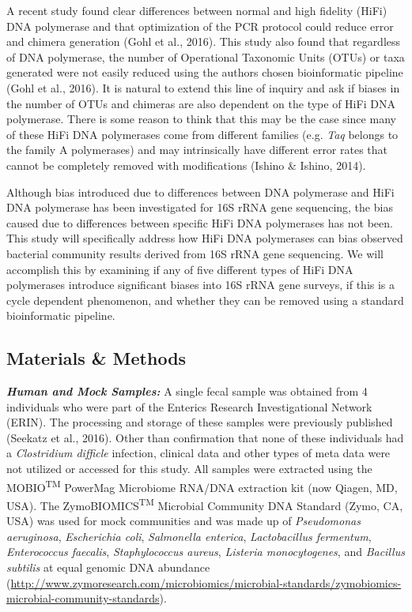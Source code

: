 \documentclass[12pt,]{article}
\begin{document}
A recent study found clear differences between normal and high fidelity
(HiFi) DNA polymerase and that optimization of the PCR protocol could
reduce error and chimera generation (Gohl et al., 2016). This study also
found that regardless of DNA polymerase, the number of Operational
Taxonomic Units (OTUs) or taxa generated were not easily reduced using
the authors chosen bioinformatic pipeline (Gohl et al., 2016). It is
natural to extend this line of inquiry and ask if biases in the number
of OTUs and chimeras are also dependent on the type of HiFi DNA
polymerase. There is some reason to think that this may be the case
since many of these HiFi DNA polymerases come from different families
(e.g. \emph{Taq} belongs to the family A polymerases) and may
intrinsically have different error rates that cannot be completely
removed with modifications (Ishino \& Ishino, 2014).

Although bias introduced due to differences between DNA polymerase and
HiFi DNA polymerase has been investigated for 16S rRNA gene sequencing,
the bias caused due to differences between specific HiFi DNA polymerases
has not been. This study will specifically address how HiFi DNA
polymerases can bias observed bacterial community results derived from
16S rRNA gene sequencing. We will accomplish this by examining if any of
five different types of HiFi DNA polymerases introduce significant
biases into 16S rRNA gene surveys, if this is a cycle dependent
phenomenon, and whether they can be removed using a standard
bioinformatic pipeline.

\newpage

\subsection{Materials \& Methods}\label{materials-methods}

\textbf{\emph{Human and Mock Samples:}} A single fecal sample was
obtained from 4 individuals who were part of the Enterics Research
Investigational Network (ERIN). The processing and storage of these
samples were previously published (Seekatz et al., 2016). Other than
confirmation that none of these individuals had a \emph{Clostridium
difficle} infection, clinical data and other types of meta data were not
utilized or accessed for this study. All samples were extracted using
the MOBIO\textsuperscript{TM} PowerMag Microbiome RNA/DNA extraction kit
(now Qiagen, MD, USA). The ZymoBIOMICS\textsuperscript{TM} Microbial
Community DNA Standard (Zymo, CA, USA) was used for mock communities and
was made up of \emph{Pseudomonas aeruginosa}, \emph{Escherichia coli},
\emph{Salmonella enterica}, \emph{Lactobacillus fermentum},
\emph{Enterococcus faecalis}, \emph{Staphylococcus aureus},
\emph{Listeria monocytogenes}, and \emph{Bacillus subtilis} at equal
genomic DNA abundance
(\url{http://www.zymoresearch.com/microbiomics/microbial-standards/zymobiomics-microbial-community-standards}).
\end{document}
